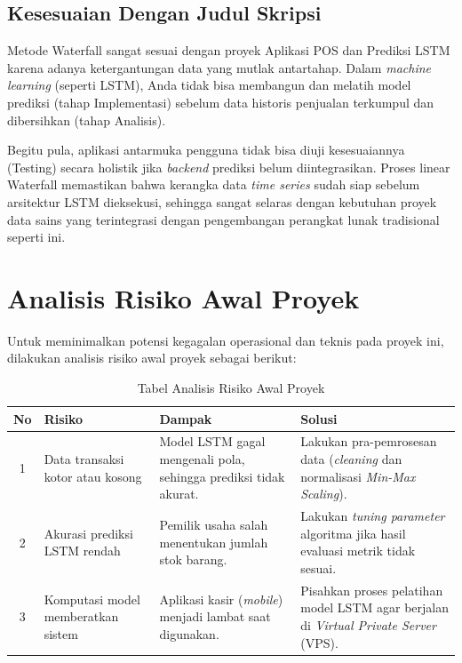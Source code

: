 \documentclass[12pt, a4paper]{article}
\begin{document}
\subsection{Kesesuaian Dengan Judul Skripsi}
Metode Waterfall sangat sesuai dengan proyek Aplikasi POS dan Prediksi LSTM karena adanya ketergantungan data yang mutlak antartahap. Dalam \textit{machine learning} (seperti LSTM), Anda tidak bisa membangun dan melatih model prediksi (tahap Implementasi) sebelum data historis penjualan terkumpul dan dibersihkan (tahap Analisis). 

Begitu pula, aplikasi antarmuka pengguna tidak bisa diuji kesesuaiannya (Testing) secara holistik jika \textit{backend} prediksi belum diintegrasikan. Proses linear Waterfall memastikan bahwa kerangka data \textit{time series} sudah siap sebelum arsitektur LSTM dieksekusi, sehingga sangat selaras dengan kebutuhan proyek data sains yang terintegrasi dengan pengembangan perangkat lunak tradisional seperti ini.

\pagebreak

\section{Analisis Risiko Awal Proyek}

Untuk meminimalkan potensi kegagalan operasional dan teknis pada proyek ini, dilakukan analisis risiko awal proyek sebagai berikut:

\begin{table}[htbp]
    \centering
    \caption{Tabel Analisis Risiko Awal Proyek}
    \label{tab:risiko_mk}
    \fontsize{10pt}{13pt}\selectfont
    \begin{tabularx}{\textwidth}{|c|p{4cm}|p{4cm}|X|}
        \hline
        \textbf{No} & \textbf{Risiko} & \textbf{Dampak} & \textbf{Solusi} \\
        \hline
        1 & Data transaksi kotor atau kosong & Model LSTM gagal mengenali pola, sehingga prediksi tidak akurat. & Lakukan pra-pemrosesan data (\textit{cleaning} dan normalisasi \textit{Min-Max Scaling}). \\
        \hline
        2 & Akurasi prediksi LSTM rendah & Pemilik usaha salah menentukan jumlah stok barang. & Lakukan \textit{tuning parameter} algoritma jika hasil evaluasi metrik tidak sesuai. \\
        \hline
        3 & Komputasi model memberatkan sistem & Aplikasi kasir (\textit{mobile}) menjadi lambat saat digunakan. & Pisahkan proses pelatihan model LSTM agar berjalan di \textit{Virtual Private Server} (VPS). \\
        \hline
    \end{tabularx}
\end{table}
\end{document}
